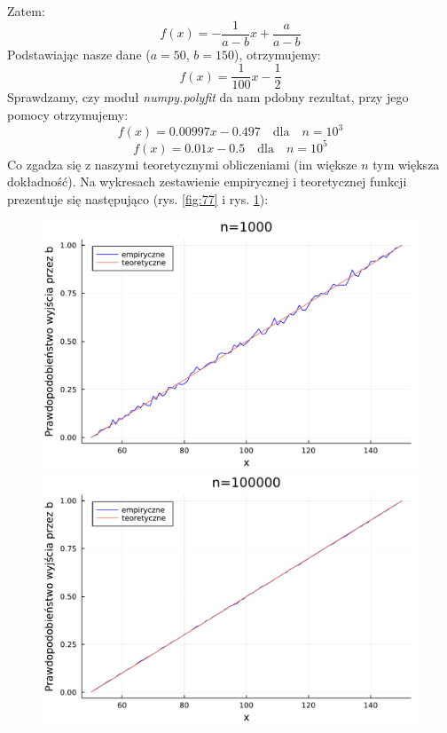 \documentclass{article}
\theoremstyle{break}
\numberwithin{equation}{subsection}
\numberwithin{figure}{section}
\begin{document}
Zatem:
$$f(x)=-\frac{1}{a-b}x + \frac{a}{a-b}$$
Podstawiając nasze dane ($a=50$, $b=150$), otrzymujemy:
$$f(x)=\frac{1}{100}x-\frac{1}{2}$$
Sprawdzamy, czy moduł \textit{numpy.polyfit} da nam pdobny rezultat, przy jego pomocy otrzymujemy:
$$f(x)=0.00997x-0.497 \quad \mathrm{dla} \quad n=10^3$$
$$f(x)=0.01x-0.5 \quad \mathrm{dla} \quad n=10^5$$
Co zgadza się z naszymi teoretycznymi obliczeniami (im większe $n$ tym większa dokładność). Na wykresach zestawienie empirycznej i teoretycznej funkcji prezentuje się następująco (rys. \ref{fig:77} i rys. \ref{fig:88}):
\begin{figure}[H]
	\begin{multicols}{2}
		\begin{center}
			\includegraphics[scale=0.30]{prob100poly.pdf}
			\caption{}
			\label{fig:77}
			\includegraphics[scale=0.30]{prob100000poly.pdf}
			\caption{}
			\label{fig:88}
		\end{center}
	\end{multicols}
\end{figure}
\end{document}
